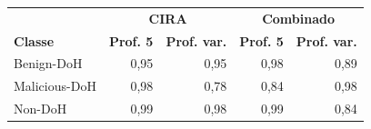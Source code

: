 \begin{tabular}{lrrrr}
\hline
\multicolumn{1}{c}{\textbf{}} & \multicolumn{2}{c}{\textbf{CIRA}} & \multicolumn{2}{c}{\textbf{Combinado}} \\
\textbf{Classe} & \textbf{Prof. 5} & \textbf{Prof. var.} & \textbf{Prof. 5} & \textbf{Prof. var.} \\ \hline
Benign-DoH & 0,95 & 0,95 & 0,98 & 0,89 \\
Malicious-DoH & 0,98 & 0,78 & 0,84 & 0,98 \\
Non-DoH & 0,99 & 0,98 & 0,99 & 0,84 \\
\hline
\end{tabular}
